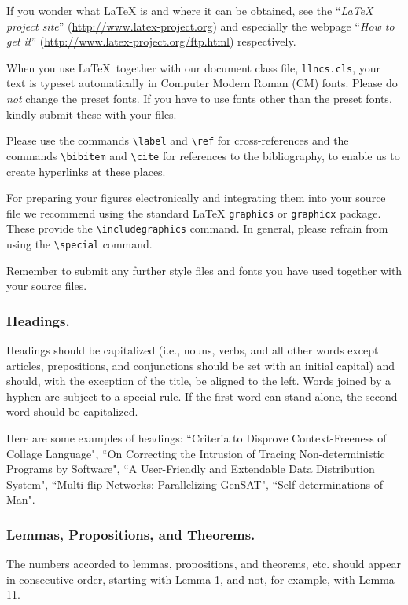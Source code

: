 \documentclass[runningheads,a4paper]{llncs}
\begin{document}
If you wonder what \LaTeX{} is and where it can be obtained, see the
``\textit{LaTeX project site}'' (\url{http://www.latex-project.org})
and especially the webpage ``\textit{How to get it}''
(\url{http://www.latex-project.org/ftp.html}) respectively.

When you use \LaTeX\ together with our document class file,
\texttt{llncs.cls},
your text is typeset automatically in Computer Modern Roman (CM) fonts.
Please do
\emph{not} change the preset fonts. If you have to use fonts other
than the preset fonts, kindly submit these with your files.

Please use the commands \verb+\label+ and \verb+\ref+ for
cross-references and the commands \verb+\bibitem+ and \verb+\cite+ for
references to the bibliography, to enable us to create hyperlinks at
these places.

For preparing your figures electronically and integrating them into
your source file we recommend using the standard \LaTeX{} \verb+graphics+ or
\verb+graphicx+ package. These provide the \verb+\includegraphics+ command.
In general, please refrain from using the \verb+\special+ command.

Remember to submit any further style files and
fonts you have used together with your source files.

\subsubsection{Headings.}

Headings should be capitalized
(i.e., nouns, verbs, and all other words
except articles, prepositions, and conjunctions should be set with an
initial capital) and should,
with the exception of the title, be aligned to the left.
Words joined by a hyphen are subject to a special rule. If the first
word can stand alone, the second word should be capitalized.

Here are some examples of headings: ``Criteria to Disprove
Context-Freeness of Collage Language", ``On Correcting the Intrusion of
Tracing Non-deterministic Programs by Software", ``A User-Friendly and
Extendable Data Distribution System", ``Multi-flip Networks:
Parallelizing GenSAT", ``Self-determinations of Man".

\subsubsection{Lemmas, Propositions, and Theorems.}

The numbers accorded to lemmas, propositions, and theorems, etc. should
appear in consecutive order, starting with Lemma 1, and not, for
example, with Lemma 11.
\end{document}
